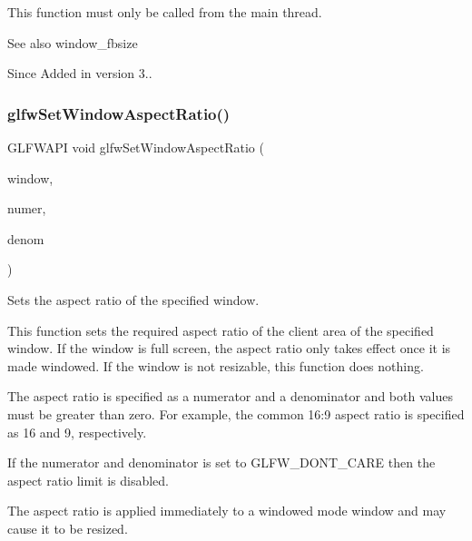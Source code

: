 This function must only be called from the main thread.

\begin{DoxySeeAlso}{See also}
window\+\_\+fbsize
\end{DoxySeeAlso}
\begin{DoxySince}{Since}
Added in version 3.. 
\end{DoxySince}
\mbox{\label{group__window_gad2ae94a2c5ee1c46a36e13a8f4ac68ac}} 
\subsubsection{\texorpdfstring{glfw\+Set\+Window\+Aspect\+Ratio()}{glfwSetWindowAspectRatio()}}
{\footnotesize\ttfamily G\+L\+F\+W\+A\+PI void glfw\+Set\+Window\+Aspect\+Ratio (\begin{DoxyParamCaption}\item[{\hyperlink{group__window_ga3c96d80d363e67d13a41b5d1821f3242}{G\+L\+F\+Wwindow} $\ast$}]{window,  }\item[{int}]{numer,  }\item[{int}]{denom }\end{DoxyParamCaption})}



Sets the aspect ratio of the specified window. 

This function sets the required aspect ratio of the client area of the specified window. If the window is full screen, the aspect ratio only takes effect once it is made windowed. If the window is not resizable, this function does nothing.

The aspect ratio is specified as a numerator and a denominator and both values must be greater than zero. For example, the common 16\+:9 aspect ratio is specified as 16 and 9, respectively.

If the numerator and denominator is set to {\ttfamily G\+L\+F\+W\+\_\+\+D\+O\+N\+T\+\_\+\+C\+A\+RE} then the aspect ratio limit is disabled.

The aspect ratio is applied immediately to a windowed mode window and may cause it to be resized.


